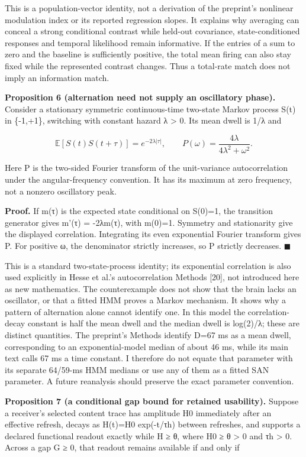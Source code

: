 \documentclass[
  american,
  11pt,
  letterpaper,
]{article}
\begin{document}
This is a population-vector identity, not a derivation of the preprint's nonlinear modulation index or its reported regression slopes. It explains why averaging can conceal a strong conditional contrast while held-out covariance, state-conditioned responses and temporal likelihood remain informative. If the entries of a sum to zero and the baseline is sufficiently positive, the total mean firing can also stay fixed while the represented contrast changes. Thus a total-rate match does not imply an information match.

\textbf{Proposition 6 (alternation need not supply an oscillatory phase).} Consider a stationary symmetric continuous-time two-state Markov process S(t) in \{-1,+1\}, switching with constant hazard λ \textgreater{} 0. Its mean dwell is 1/λ and

\[
\mathbb E[S(t)S(t+\tau)]=e^{-2\lambda|\tau|},\qquad
P(\omega)=\frac{4\lambda}{4\lambda^2+\omega^2}. \tag{10}
\]

Here P is the two-sided Fourier transform of the unit-variance autocorrelation under the angular-frequency convention. It has its maximum at zero frequency, not a nonzero oscillatory peak.

\textbf{Proof.} If m(τ) is the expected state conditional on S(0)=1, the transition generator gives m'(τ) = -2λm(τ), with m(0)=1. Symmetry and stationarity give the displayed correlation. Integrating its even exponential Fourier transform gives P. For positive ω, the denominator strictly increases, so P strictly decreases. \(\blacksquare\)

This is a standard two-state-process identity; its exponential correlation is also used explicitly in Hesse et al.'s autocorrelation Methods {[}20{]}, not introduced here as new mathematics. The counterexample does not show that the brain lacks an oscillator, or that a fitted HMM proves a Markov mechanism. It shows why a pattern of alternation alone cannot identify one. In this model the correlation-decay constant is half the mean dwell and the median dwell is log(2)/λ; these are distinct quantities. The preprint's Methods identify D=67 ms as a mean dwell, corresponding to an exponential-model median of about 46 ms, while its main text calls 67 ms a time constant. I therefore do not equate that parameter with its separate 64/59-ms HMM medians or use any of them as a fitted SAN parameter. A future reanalysis should preserve the exact parameter convention.

\textbf{Proposition 7 (a conditional gap bound for retained usability).} Suppose a receiver's selected content trace has amplitude H0 immediately after an effective refresh, decays as H(t)=H0 exp(-t/τh) between refreshes, and supports a declared functional readout exactly while H ≥ θ, where H0 ≥ θ \textgreater{} 0 and τh \textgreater{} 0. Across a gap G ≥ 0, that readout remains available if and only if
\end{document}
